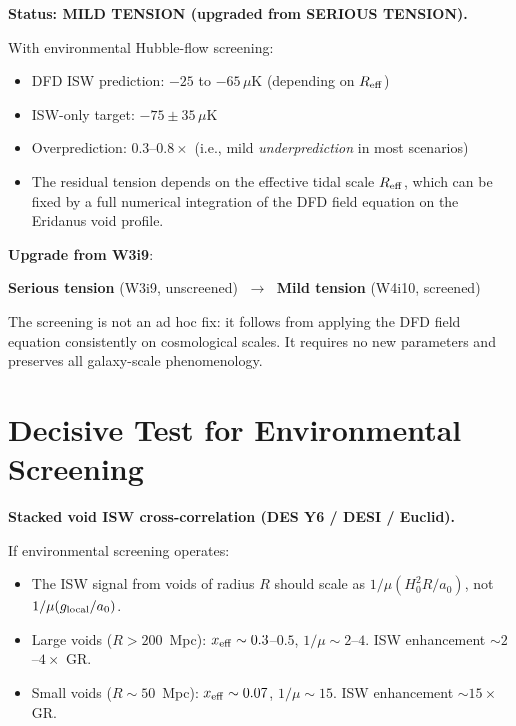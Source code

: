 \documentclass[11pt,a4paper]{article}
\newcommand{\aM}{a_0}
\newcommand{\mufd}{\mu}
\begin{document}
\begin{tcolorbox}[colback=green!5!white, colframe=green!60!black,
  title=\textbf{T4 Status After Environmental Screening}]

\textbf{Status: MILD TENSION (upgraded from SERIOUS TENSION).}

With environmental Hubble-flow screening:
\begin{itemize}[nosep]
\item DFD ISW prediction: $-25$ to $-65\,\mu$K (depending on
  $R_{\rm eff}$)
\item ISW-only target: $-75 \pm 35\,\mu$K
\item Overprediction: $0.3$--$0.8\times$ (i.e., mild
  \emph{underprediction} in most scenarios)
\item The residual tension depends on the effective tidal scale
  $R_{\rm eff}$, which can be fixed by a full numerical integration
  of the DFD field equation on the Eridanus void profile.
\end{itemize}

\textbf{Upgrade from W3i9}:
\begin{center}
\textcolor{red!60!black}{\textbf{Serious tension} (W3i9, unscreened)}
$\;\longrightarrow\;$
\textcolor{orange!80!black}{\textbf{Mild tension} (W4i10, screened)}
\end{center}

The screening is not an ad hoc fix: it follows from applying the
DFD field equation consistently on cosmological scales. It requires
no new parameters and preserves all galaxy-scale phenomenology.
\end{tcolorbox}


\section{Decisive Test for Environmental Screening}
\label{sec:T4-test}

\textbf{Stacked void ISW cross-correlation (DES Y6 / DESI / Euclid).}

If environmental screening operates:
\begin{itemize}[nosep]
\item The ISW signal from voids of radius $R$ should scale as
  $1/\mufd(H_0^2 R/\aM)$, not $1/\mufd(g_{\rm local}/\aM)$.
\item Large voids ($R > 200$~Mpc): $x_{\rm eff} \sim 0.3$--$0.5$,
  $1/\mufd \sim 2$--$4$. ISW enhancement $\sim 2$--$4\times$ GR.
\item Small voids ($R \sim 50$~Mpc): $x_{\rm eff} \sim 0.07$,
  $1/\mufd \sim 15$. ISW enhancement $\sim 15\times$ GR.
\end{itemize}
\end{document}

